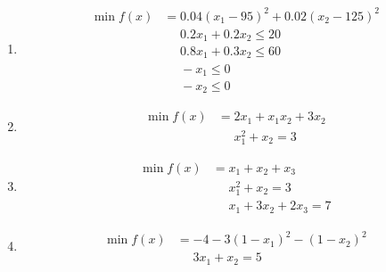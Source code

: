 \documentclass[italian,12pt]{article}
\begin{document}
\begin{enumerate}[1)]
		\item %
		\begin{minipage}[c]{0.8\textwidth}%
			\begin{align*}
				\min f(x) & =0.04(x_{1}-95)^{2}+0.02(x_{2}-125)^{2}\\
					& \phantom{=}0.2 x_{1} + 0.2 x_{2} \leq 20\\
					& \phantom{=}0.8 x_{1} + 0.3 x_{2} \leq 60\\
					& \phantom{=}-x_1 \leq 0\\
					& \phantom{=}-x_2 \leq 0\end{align*}
		\end{minipage}
		
		
		\item %
		\begin{minipage}[c]{0.8\textwidth}%
			\begin{align*}
				\min f(x) & = 2 x_{1} + x_{1} x_{2} + 3 x_{2}\\
					& \phantom{=}x_{1}^2+x_{2} = 3\end{align*}
		\end{minipage}
		
		\item %
		\begin{minipage}[c]{0.8\textwidth}%
			\begin{align*}
				\min f(x) & =x_{1}+x_{2}+x_{3}\\
					& \phantom{ =}x_{1}^2+x_{2}=3\\
					& \phantom{ =}x_{1}+3x_{2}+2x_{3} = 7\end{align*}
			\end{minipage}
			
		\item %
		\begin{minipage}[c]{0.8\textwidth}%
			\begin{align*}
				\min f(x) & =-4-3(1-x_{1})^{2}-(1-x_{2})^{2}\\
					& \phantom{=}3x_{1}+x_{2}=5\end{align*}
			\end{minipage}
\end{enumerate}
\end{document}
